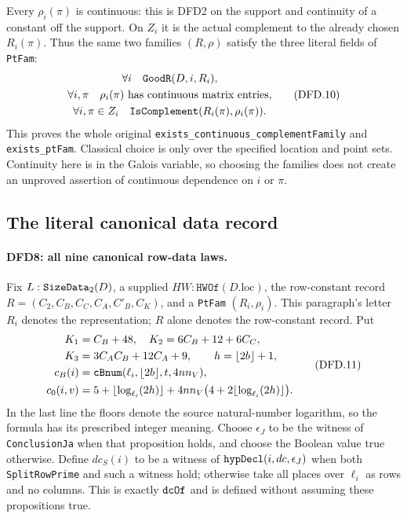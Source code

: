 Every $\rho_i(\pi)$ is continuous: this is DFD2 on the support
and continuity of a constant off the support. On $Z_i$ it is
the actual complement to the already chosen $R_i(\pi)$.
Thus the same two families $(R,\rho)$ satisfy the three
literal fields of \texttt{Pt\allowbreak Fam}:
\[
 \begin{gathered}
   \forall i\quad\texttt{Good\allowbreak R}(D,i,R_i),\\
   \forall i,\pi\quad\rho_i(\pi)\text{ has continuous matrix entries},\\
   \forall i,\pi\in Z_i\quad
       \texttt{Is\allowbreak Complement}(R_i(\pi),\rho_i(\pi)).
 \end{gathered}                                         \tag{DFD.10}
\]
This proves the whole original
\texttt{exists\_\allowbreak continuous\_\allowbreak complement\allowbreak Family} and
\texttt{exists\_\allowbreak pt\allowbreak Fam}. Classical choice is only over the
specified location and point sets. Continuity here is in the
Galois variable, so choosing the families does not create an
unproved assertion of continuous dependence on $i$ or $\pi$.

\subsection{The literal canonical data record}

\paragraph{DFD8: all nine canonical row-data laws.}
\label{claim:DFD8}
Fix $L:\texttt{Size\allowbreak Data}_2(D)$, a supplied
$HW:\texttt{HWOf}(D.\mathrm{loc})$, the row-constant record
$R=(C_2,C_B,C_C,C_A,C'_B,C_K)$, and a \texttt{Pt\allowbreak Fam}
$(R_i,\rho_i)$. This paragraph's letter $R_i$ denotes the
representation; $R$ alone denotes the row-constant record.
Put
\[
 \begin{split}
 K_1&=C_B+48,\quad K_2=6C_B+12+6C_C,\\
 K_3&=3C_AC_B+12C_A+9,\qquad h=\lfloor2b\rfloor+1,\\
 c_B(i)&=\texttt{c\allowbreak Bnum}(\ell_i,\lfloor2b\rfloor,t,4nn_V),\\
 c_0(i,v)&=5+\lfloor\log_{\ell_i}(2h)\rfloor
       +4nn_V\bigl(4+2\lfloor\log_{\ell_i}(2h)\rfloor\bigr).
 \end{split}                                           \tag{DFD.11}
\]
In the last line the floors denote the source natural-number
logarithm, so the formula has its prescribed integer meaning.
Choose $\epsilon_J$ to be the witness of
\texttt{Conclusion\allowbreak Ja} when that proposition holds, and choose
the Boolean value true otherwise. Define $dc_S(i)$ to be a
witness of $\texttt{hyp\allowbreak Decl}(i,dc,\epsilon_J)$ when both
\texttt{Split\allowbreak Row\allowbreak Prime} and such a witness hold; otherwise take
all places over $\ell_i$ as rows and no columns. This is exactly
$\texttt{dc\allowbreak Of}$ and is defined without assuming these
propositions true.

